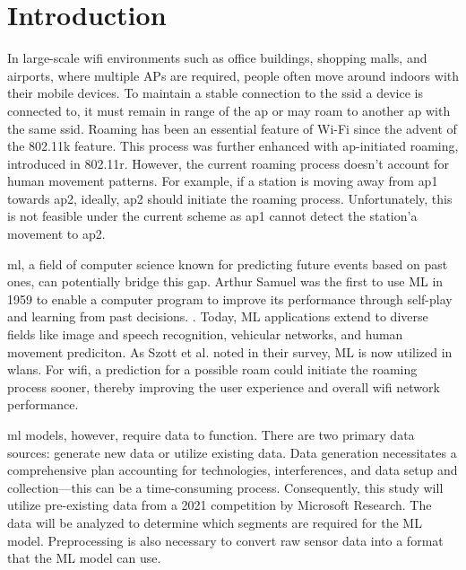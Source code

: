 \chapter{Introduction}\label{sec:intro}



In large-scale \ac{wifi} environments such as office buildings, shopping malls, and airports, where multiple \acp{AP} are required, people often move around indoors with their mobile devices.
To maintain a stable connection to the \ac{ssid} a device is connected to, it must remain in range of the \ac{ap} or may roam to another \ac{ap} with the same \ac{ssid}.
Roaming has been an essential feature of Wi-Fi since the advent of the 802.11k\cite{802.11k} feature.
This process was further enhanced with \ac{ap}-initiated roaming, introduced in 802.11r\cite{802.11r}.
However, the current roaming process doesn't account for human movement patterns. 
For example, if a station is moving away from \ac{ap}1 towards \ac{ap}2, ideally, \ac{ap}2 should initiate the roaming process.
Unfortunately, this is not feasible under the current scheme as \ac{ap}1 cannot detect the station'a movement to \ac{ap}2.

\ac{ml}, a field of computer science known for predicting future events based on past ones, can potentially bridge this gap. 
Arthur Samuel was the first to use ML in 1959 to enable a computer program to improve its performance through self-play and learning from past decisions. \cite{SamuelML}.
Today, ML applications extend to diverse fields like image and speech recognition, vehicular networks\cite{MachineLearningVehicular}, and human movement prediciton\cite{asaharaPedestrianmovementPredictionBased2011}.
As Szott et al. noted in their survey\cite{szottWiFiMeetsML2022}, ML is now utilized in \acp{wlan}.
For \ac{wifi}, a prediction for a possible roam could initiate the roaming process sooner, thereby improving the user experience and overall \ac{wifi} network performance.

\ac{ml} models, however, require data to function. 
There are two primary data sources: generate new data or utilize existing data. 
Data generation necessitates a comprehensive plan accounting for technologies, interferences, and data setup and collection—this can be a time-consuming process. 
Consequently, this study will utilize pre-existing data from a 2021 competition by Microsoft Research\cite{IndoorLocationNavigation}. 
The data will be analyzed to determine which segments are required for the ML model. 
Preprocessing is also necessary to convert raw sensor data into a format that the ML model can use.

